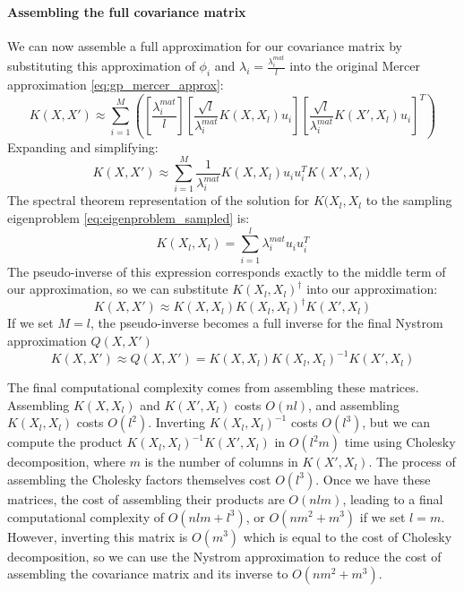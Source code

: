 \paragraph{Assembling the full covariance matrix}
We can now assemble a full approximation for our covariance matrix by substituting this approximation of $\phi_i$ and $\lambda_i = \frac{\lambda_i^{mat}}{l}$ into the original Mercer approximation \ref{eq:gp_mercer_approx}:
\begin{equation*}
    K(X, X') \approx \sum_{i=1}^{M} \left( \left[ \frac{\lambda_i^{mat}}{l} \right] \left[ \frac{\sqrt{l}}{\lambda_i^{mat}} K(X, X_l) u_i \right] \left[ \frac{\sqrt{l}}{\lambda_i^{mat}} K(X', X_l) u_i \right]^T \right)
\end{equation*}
Expanding and simplifying:
\begin{equation*}
    K(X, X') \approx \sum_{i=1}^{M} \frac{1}{\lambda_i^{mat}} K(X, X_l) u_i u_i^T K(X', X_l)
\end{equation*}
The spectral theorem representation of the solution for $K(X_l, X_l$ to the sampling eigenproblem \ref{eq:eigenproblem_sampled} is:
\begin{equation*}
    K(X_l, X_l) = \sum_{i=1}^{l} \lambda_i^{mat} u_i u_i^T
\end{equation*}
The pseudo-inverse of this expression corresponds exactly to the middle term of our approximation, so we can substitute $K(X_l, X_l)^{\dagger}$ into our approximation:
\begin{equation*}
    K(X, X') \approx K(X, X_l) K(X_l, X_l)^{\dagger} K(X', X_l)
\end{equation*}
If we set $M = l$, the pseudo-inverse becomes a full inverse for the final Nystrom approximation $Q(X, X')$
\begin{equation} \label{eq:nystrom_approx}
    K(X, X') \approx Q(X, X') = K(X, X_l) K(X_l, X_l)^{-1} K(X', X_l)
\end{equation}

The final computational complexity comes from assembling these matrices. Assembling $K(X, X_l)$ and $K(X', X_l)$ costs $O(nl)$, and assembling $K(X_l, X_l)$ costs $O(l^2)$. Inverting $K(X_l, X_l)^{-1}$ costs $O(l^3)$, but we can compute the product $K(X_l, X_l)^{-1} K(X', X_l)$ in $O(l^2m)$ time using Cholesky decomposition, where $m$ is the number of columns in $K(X', X_l)$. The process of assembling the Cholesky factors themselves cost $O(l^3)$. Once we have these matrices, the cost of assembling their products are $O(nlm)$, leading to a final computational complexity of $O(nlm + l^3)$, or $O(nm^2 + m^3)$ if we set $l = m$. However, inverting this matrix is $O(m^3)$ which is equal to the cost of Cholesky decomposition, so we can use the Nystrom approximation to reduce the cost of assembling the covariance matrix and its inverse to $O(nm^2 + m^3)$.

